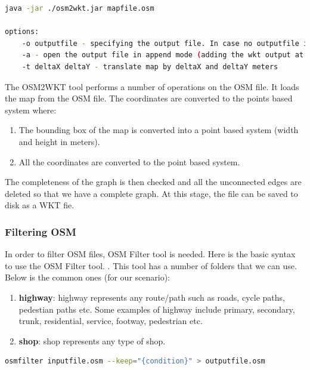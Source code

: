 \begin{lstlisting}[language=bash]
java -jar ./osm2wkt.jar mapfile.osm

options:
	-o outputfile - specifying the output file. In case no outputfile is mentioned, .wkt is appended to the name of input file.
	-a - open the output file in append mode (adding the wkt output at the end of the output file)
	-t deltaX deltaY - translate map by deltaX and deltaY meters
\end{lstlisting}

\vspace{8mm}
The OSM2WKT tool \cite{mayer2010osm} performs a number of operations on the OSM file. It loads the map from the OSM file. The coordinates are converted to the points based system where:
   	 	\begin{enumerate}
	   	 	\item The bounding box of the map is converted into a point based system (width and height in meters).
   		 	\item All the coordinates are converted to the point based system.
   		 \end{enumerate}
   	 The completeness of the graph is then checked and all the unconnected edges are deleted so that we have a complete graph. At this stage, the file can be saved to disk as a WKT fie.

\subsubsection{Filtering OSM}
In order to filter OSM files, OSM Filter tool \cite{osm-filter} is needed. Here is the basic syntax to use the OSM Filter tool.  \cite{osm-filter}. This tool has a number of folders that we can use. Below is the common ones (for our scenario):

\begin{enumerate}
	\item  \textbf{highway}: highway represents any route/path such as roads, cycle paths, pedestian paths etc. Some examples of highway include primary, secondary, trunk, residential, service, footway, pedestrian etc.
	\item \textbf{shop}: shop represents any type of shop.

\end{enumerate}
\vspace{2mm}
\begin{lstlisting}[language=bash]
	osmfilter inputfile.osm --keep="{condition}" > outputfile.osm
\end{lstlisting}
\vspace{5mm}

